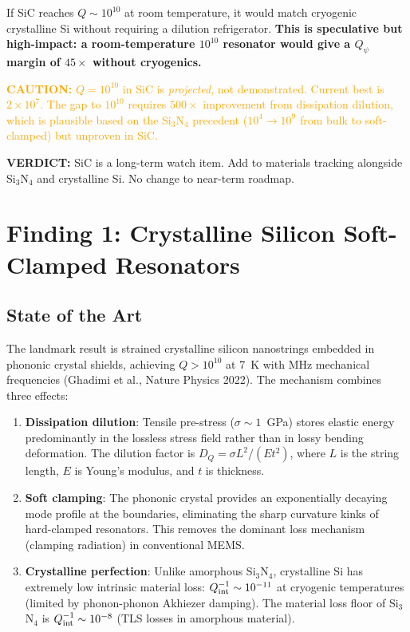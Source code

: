 \documentclass[11pt]{article}
\theoremstyle{definition}
\theoremstyle{remark}
\newcommand{\ee}[1]{\times 10^{#1}}
\newcommand{\Qpsi}{Q_\psi}
\newcommand{\caution}[1]{\textcolor{orange}{\textbf{CAUTION:} #1}}
\newcommand{\verdict}[1]{\textcolor{green!50!black}{\textbf{VERDICT:} #1}}
\begin{document}
\begin{tcolorbox}[colback=blue!5!white, colframe=blue!50!black,
  title=\textbf{W4i13 TOP 5 FINDINGS --- Ranked by Programme Impact}]
\begin{enumerate}
If SiC reaches $Q \sim 10^{10}$ at room temperature, it would match
cryogenic crystalline Si without requiring a dilution refrigerator.
\textbf{This is speculative but high-impact: a room-temperature
$10^{10}$ resonator would give a $\Qpsi$ margin of $45\times$ without
cryogenics.}

\caution{$Q = 10^{10}$ in SiC is \textit{projected}, not demonstrated.
Current best is $2\ee{7}$. The gap to $10^{10}$ requires $500\times$
improvement from dissipation dilution, which is plausible based on
the Si$_3$N$_4$ precedent ($10^4 \to 10^9$ from bulk to soft-clamped)
but unproven in SiC.}

\verdict{SiC is a long-term watch item. Add to materials tracking
alongside Si$_3$N$_4$ and crystalline Si. No change to near-term
roadmap.}
\end{enumerate}
\end{tcolorbox}


\section{Finding 1: Crystalline Silicon Soft-Clamped Resonators}
\label{sec:crystalline_si}

\subsection{State of the Art}

The landmark result is strained crystalline silicon nanostrings
embedded in phononic crystal shields, achieving $Q > 10^{10}$ at
7~K with MHz mechanical frequencies (Ghadimi et al., Nature Physics
2022). The mechanism combines three effects:

\begin{enumerate}[nosep]
\item \textbf{Dissipation dilution}: Tensile pre-stress ($\sigma
  \sim 1$~GPa) stores elastic energy predominantly in the lossless
  stress field rather than in lossy bending deformation. The dilution
  factor is $D_Q = \sigma L^2/(E t^2)$, where $L$ is the string
  length, $E$ is Young's modulus, and $t$ is thickness.

\item \textbf{Soft clamping}: The phononic crystal provides an
  exponentially decaying mode profile at the boundaries, eliminating
  the sharp curvature kinks of hard-clamped resonators. This removes
  the dominant loss mechanism (clamping radiation) in conventional
  MEMS.

\item \textbf{Crystalline perfection}: Unlike amorphous Si$_3$N$_4$,
  crystalline Si has extremely low intrinsic material loss:
  $Q_{\rm int}^{-1} \sim 10^{-11}$ at cryogenic temperatures
  (limited by phonon-phonon Akhiezer damping). The material loss
  floor of Si$_3$N$_4$ is $Q_{\rm int}^{-1} \sim 10^{-8}$ (TLS
  losses in amorphous material).
\end{enumerate}
\end{document}
